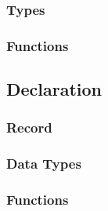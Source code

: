 \subsubsection{Types}

\subsubsection{Functions}

\subsection{Declaration}
\subsubsection{Record}

\subsubsection{Data Types}

\subsubsection{Functions}
